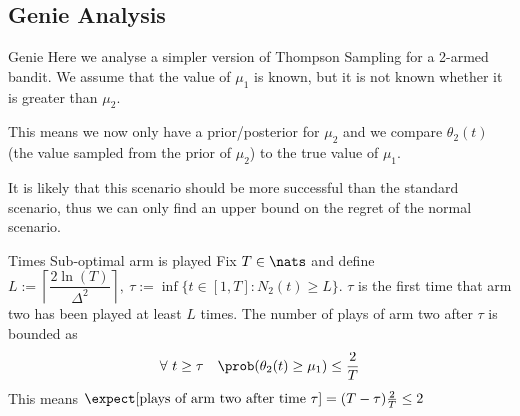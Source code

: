 \documentclass[11pt,a4paper]{article}
\begin{document}
\subsection{Genie Analysis}

\begin{remark}{Genie}
  Here we analyse a simpler version of Thompson Sampling for a 2-armed bandit. We assume that the value of $\mu_1$ is known, but it is not known whether it is greater than $\mu_2$.
  \par This means we now only have a prior/posterior for $\mu_2$ and we compare $\theta_2(t)$ (the value sampled from the prior of $\mu_2$) to the true value of $\mu_1$.
  \par It is likely that this scenario should be more successful than the standard scenario, thus we can only find an upper bound on the regret of the normal scenario.
\end{remark}

\begin{theorem}{Times Sub-optimal arm is played}
  Fix $T\in\nats$ and define $L:=\left\lceil\dfrac{2\ln(T)}{\Delta^2}\right\rceil,\ \tau:=\inf\{t\in[1,T]:N_2(t)\geq L\}$.
  $\tau$ is the first time that arm two has been played at least $L$ times. The number of plays of arm two after $\tau$ is bounded as
  \[ \forall\ t\geq\tau\quad \prob(\theta_2(t)\geq\mu_1)\leq\frac2T \]
  This means $\expect[\text{plays of arm two after time }\tau]=(T-\tau)\frac{2}T\leq2$
\end{theorem}
\end{document}
